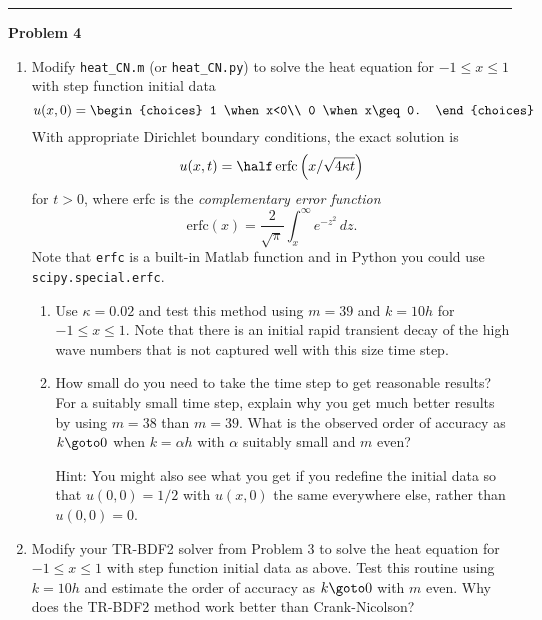 \documentclass[10pt]{article}
\begin{document}



\vskip 1cm
\hrule
{\bf Problem 4}  


\begin{enumerate}

\item Modify \verb+heat_CN.m+  (or \verb+heat_CN.py+)
to solve the heat equation for
$-1\leq x \leq 1$ with step function  initial data
\begin{equation} \label{9.3a}
u(x,0) = \begin{choices}  1 \when x<0\\  0 \when x\geq 0. \end{choices}
\end{equation} 
With appropriate Dirichlet boundary conditions, the exact solution is
\begin{equation} \label{9.3b}
u(x,t) = \half \, \text{erfc} \left(x / \sqrt{4 \kappa t}\right)
\end{equation} 
for $t>0$, where erfc is the {\em complementary error function}
\[
\text{erfc}(x) = \frac{2}{\sqrt{\pi}} \int_x^\infty e^{-z^2}\,dz.
\]
Note that {\tt erfc} is a built-in Matlab function and in Python you could
use \verb+scipy.special.erfc+.

\begin{enumerate}
\item
Use $\kappa = 0.02$ and
test this method using $m=39$ and $k = 10h$ for $-1\leq x \leq 1$.  
Note that there is an initial rapid transient decay of the high
wave numbers that is not captured well with this size time step.

\item
How small do you need to take the time step to get reasonable results?
For a suitably small time step, explain why you get much better results by
using $m=38$ than $m=39$.  What is the observed order of accuracy as $k\goto
0$ when $k = \alpha h$ with $\alpha$ suitably small and $m$ even?

Hint: You might also see what you get if you redefine the initial data so
that $u(0,0)=1/2$ with $u(x,0)$ the same everywhere else, rather than
$u(0,0) = 0$.

\end{enumerate}

\item Modify your TR-BDF2 solver from Problem 3
to solve the heat equation for
$-1\leq x \leq 1$ with step function  initial data as above.
Test this routine using $k=10h$ and estimate the order of accuracy as
$k\goto 0$ with $m$ even.  Why does the TR-BDF2 method work better than
Crank-Nicolson?

\end{enumerate} 





\end{document}
